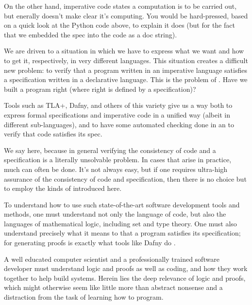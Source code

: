 \documentclass[letterpaper,10pt,english]{sphinxmanual}
\begin{document}
On the other hand, imperative code states  a computation is to be
carried out, but enerally doesn’t make clear  it’s computing. You
would be hard-pressed, based on a quick look at the Python code above,
to explain  it does (but for the fact that we embedded the spec
into the code as a doc string).

We are driven to a situation in which we have to express what we want
and how to get it, respectively, in very different languages. This
situation creates a difficult new problem: to verify that a program
written in an imperative language satisfies a specification written in
a declarative language.  This is the problem of . Have
we built a program right (where right is defined by a specification)?

Tools such as TLA+, Dafny, and others of this variety give us a way
both to express formal specifications and imperative code in a unified
way (albeit in different sub-languages), and to have some automated
checking done in an  to verify that code satisfies its spec.

We say  here, because in general verifying the consistency of
code and a specification is a literally unsolvable problem. In cases
that arise in practice, much can often be done. It’s not always easy,
but if one requires ultra-high assurance of the consistency of code
and specification, then there is no choice but to employ the kinds of
 introduced here.

To understand how to use such state-of-the-art software development
tools and methods, one must understand not only the language of code,
but also the languages of mathematical logic, including set and type
theory. One must also understand precisely what it means to 
that a program satisfies its specification; for generating proofs is
exactly what tools like Dafny do .

A well educated computer scientist and a professionally trained
software developer must understand logic and proofs as well as coding,
and how they work together to help build  systems. Herein
lies the deep relevance of logic and proofs, which might otherwise
seem like little more than abstract nonsense and a distraction from
the task of learning how to program.
\end{document}
